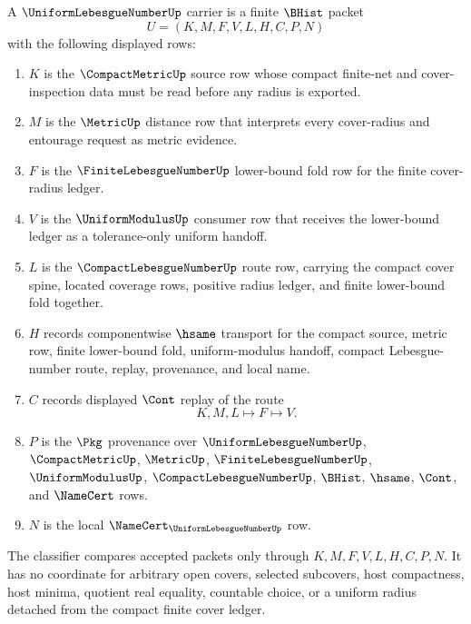 \begin{definition}
\label{def:uniform-lebesgue-number-carrier}
A $\UniformLebesgueNumberUp$ carrier is a finite $\BHist$ packet
$$
U=(K,M,F,V,L,H,C,P,N)
$$
with the following displayed rows:
\begin{enumerate}
\item $K$ is the $\CompactMetricUp$ source row whose compact finite-net and cover-inspection data must be read before any radius is exported.
\item $M$ is the $\MetricUp$ distance row that interprets every cover-radius and entourage request as metric evidence.
\item $F$ is the $\FiniteLebesgueNumberUp$ lower-bound fold row for the finite cover-radius ledger.
\item $V$ is the $\UniformModulusUp$ consumer row that receives the lower-bound ledger as a tolerance-only uniform handoff.
\item $L$ is the $\CompactLebesgueNumberUp$ route row, carrying the compact cover spine, located coverage rows, positive radius ledger, and finite lower-bound fold together.
\item $H$ records componentwise $\hsame$ transport for the compact source, metric row, finite lower-bound fold, uniform-modulus handoff, compact Lebesgue-number route, replay, provenance, and local name.
\item $C$ records displayed $\Cont$ replay of the route
$$
K,M,L \longmapsto F \longmapsto V .
$$
\item $P$ is the $\Pkg$ provenance over $\UniformLebesgueNumberUp$, $\CompactMetricUp$, $\MetricUp$, $\FiniteLebesgueNumberUp$, $\UniformModulusUp$, $\CompactLebesgueNumberUp$, $\BHist$, $\hsame$, $\Cont$, and $\NameCert$ rows.
\item $N$ is the local $\NameCert_{\UniformLebesgueNumberUp}$ row.
\end{enumerate}
The classifier compares accepted packets only through $K,M,F,V,L,H,C,P,N$. It has no coordinate for arbitrary open covers, selected subcovers, host compactness, host minima, quotient real equality, countable choice, or a uniform radius detached from the compact finite cover ledger.
\end{definition}

